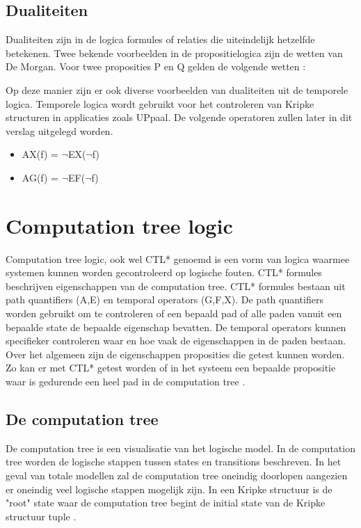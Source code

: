 \subsection{Dualiteiten}
Dualiteiten zijn in de logica formules of relaties die uiteindelijk hetzelfde betekenen. Twee bekende voorbeelden in de propositielogica zijn de wetten van De Morgan. Voor twee proposities P en Q gelden de volgende wetten \cite{OeleLogica}:
Op deze manier zijn er ook diverse voorbeelden van dualiteiten uit de temporele logica. Temporele logica wordt gebruikt voor het controleren van Kripke structuren in applicaties zoals UPpaal. De volgende operatoren zullen later in dit verslag uitgelegd worden. \cite{modelchecking}
\begin{itemize}
\item AX(f) = $\lnot$EX($\lnot$f)
\item AG(f) = $\lnot$EF($\lnot$f)
\end{itemize}
\section{Computation tree logic}
Computation tree logic, ook wel CTL* genoemd is een vorm van logica waarmee systemen kunnen worden gecontroleerd op logische fouten. CTL* formules beschrijven eigenschappen van de computation tree. CTL* formules bestaan uit path quantifiers (A,E) en temporal operators (G,F,X). De path quantifiers worden gebruikt om te controleren of een bepaald pad of alle paden vanuit een bepaalde state de bepaalde eigenschap bevatten. De temporal operators kunnen specifieker controleren waar en hoe vaak de eigenschappen in de paden bestaan. Over het algemeen zijn de eigenschappen proposities die getest kunnen worden. Zo kan er met CTL* getest worden of in het systeem een bepaalde propositie waar is gedurende een heel pad in de computation tree \cite{modelchecking}.
\subsection{De computation tree}
De computation tree is een visualisatie van het logische model. In de computation tree worden de logische stappen tussen states en transitions beschreven. In het geval van totale modellen zal de computation tree oneindig doorlopen aangezien er oneindig veel logische stappen mogelijk zijn. In een Kripke structuur is de "root" state waar de computation tree begint de initial state van de Kripke structuur tuple \cite{modelchecking}.
